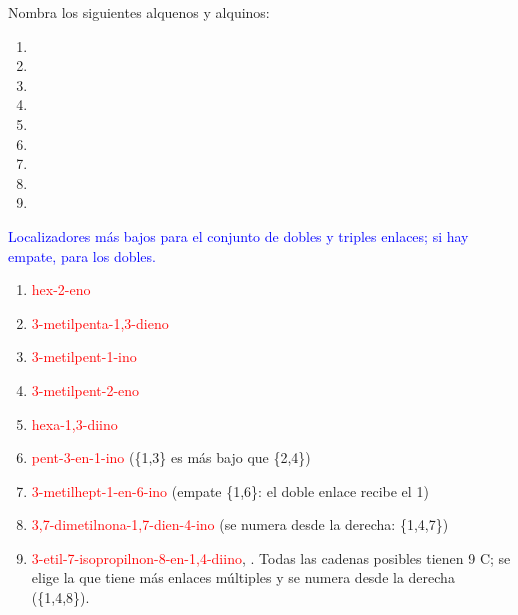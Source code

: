 \begin{exercise}
    Nombra los siguientes alquenos y alquinos:
    \begin{enumerate}[label=\alph*)]
        \item {}
        \item {}
        \item {}
        \item {}
        \item {}
        \item {}
        \item {}
        \item {}
        \item {}
    \end{enumerate}
    \begin{solu}
        \textcolor{blue}{Localizadores más bajos para el conjunto de dobles y triples enlaces; si hay empate, para los dobles.}
        \begin{enumerate}[label=\alph*)]
            \item \textcolor{red}{hex-2-eno}
            \item \textcolor{red}{3-metilpenta-1,3-dieno}
            \item \textcolor{red}{3-metilpent-1-ino}
            \item \textcolor{red}{3-metilpent-2-eno}
            \item \textcolor{red}{hexa-1,3-diino}
            \item \textcolor{red}{pent-3-en-1-ino} (\{1,3\} es más bajo que \{2,4\})
            \item \textcolor{red}{3-metilhept-1-en-6-ino} (empate \{1,6\}: el doble enlace recibe el 1)
            \item \textcolor{red}{3,7-dimetilnona-1,7-dien-4-ino} (se numera desde la derecha: \{1,4,7\})
            \item \textcolor{red}{3-etil-7-isopropilnon-8-en-1,4-diino}, . Todas las cadenas posibles tienen 9 C; se elige la que tiene más enlaces múltiples y se numera desde la derecha (\{1,4,8\}).
        \end{enumerate}
    \end{solu}
\end{exercise}

